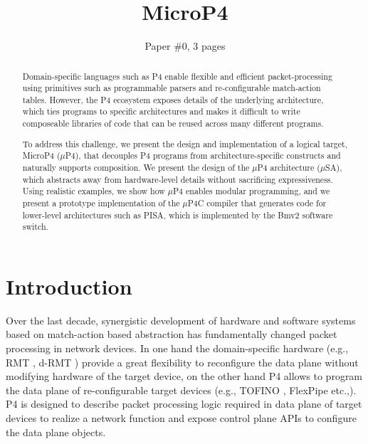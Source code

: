 \documentclass{hotnets19}
\begin{document}


\title{MicroP4}

\author{Paper \#0, 3 pages}

\maketitle

\begin{abstract}
Domain-specific languages such as P4 enable flexible and efficient
packet-processing using primitives such as programmable parsers and
re-configurable match-action tables. However, the P4 ecosystem exposes
details of the underlying architecture, which ties programs to
specific architectures and makes it difficult to write composeable
libraries of code that can be reused across many different programs.

To address this challenge, we present the design and implementation of
a logical target, MicroP4 ($\mu$P4), that decouples P4 programs from
architecture-specific constructs and naturally supports composition.
We present the design of the $\mu$P4 architecture ($\mu$SA), which
abstracts away from hardware-level details without sacrificing
expressiveness. Using realistic examples, we show how $\mu$P4 enables
modular programming, and we present a prototype implementation of the
$\mu$P4C compiler that generates code for lower-level architectures
such as PISA, which is implemented by the Bmv2 software switch.
\end{abstract}

\section{Introduction}
Over the last decade, synergistic development of hardware and software systems based on match-action based abstraction has fundamentally changed packet processing in network devices.
In one hand the domain-specific hardware (e.g., RMT \cite{Bosshart:2013:FMF:2486001.2486011}, d-RMT \cite{Chole:2017:DDP:3098822.3098823}) provide a great flexibility to reconfigure the data plane without modifying hardware of the target device, on the other hand P4 \cite{Bosshart:2014:PPP:2656877.2656890, p4lang} allows to program the data plane of re-configu\-rable target devices (e.g., TOFINO \cite{tofino}, FlexPipe etc.,).
P4 is designed to describe packet processing logic required in data plane of target devices to realize a network function and expose control plane APIs to configure the data plane objects.
\end{document}
